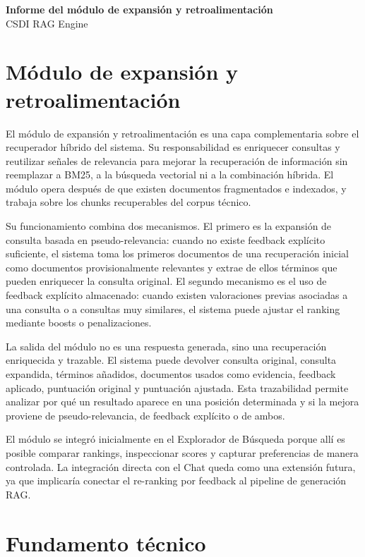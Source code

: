 \documentclass[12pt,a4paper]{article}
\begin{document}
\begin{center}
  {\Large\bfseries Informe del módulo de expansión y retroalimentación}\\[0.35cm]
  {\large CSDI RAG Engine}
\end{center}
\vspace{0.2cm}

\section{Módulo de expansión y retroalimentación}

El módulo de expansión y retroalimentación es una capa complementaria sobre el recuperador híbrido del sistema. Su responsabilidad es enriquecer consultas y reutilizar señales de relevancia para mejorar la recuperación de información sin reemplazar a BM25, a la búsqueda vectorial ni a la combinación híbrida. El módulo opera después de que existen documentos fragmentados e indexados, y trabaja sobre los chunks recuperables del corpus técnico.

Su funcionamiento combina dos mecanismos. El primero es la expansión de consulta basada en pseudo-relevancia: cuando no existe feedback explícito suficiente, el sistema toma los primeros documentos de una recuperación inicial como documentos provisionalmente relevantes y extrae de ellos términos que pueden enriquecer la consulta original. El segundo mecanismo es el uso de feedback explícito almacenado: cuando existen valoraciones previas asociadas a una consulta o a consultas muy similares, el sistema puede ajustar el ranking mediante boosts o penalizaciones.

La salida del módulo no es una respuesta generada, sino una recuperación enriquecida y trazable. El sistema puede devolver consulta original, consulta expandida, términos añadidos, documentos usados como evidencia, feedback aplicado, puntuación original y puntuación ajustada. Esta trazabilidad permite analizar por qué un resultado aparece en una posición determinada y si la mejora proviene de pseudo-relevancia, de feedback explícito o de ambos.

El módulo se integró inicialmente en el Explorador de Búsqueda porque allí es posible comparar rankings, inspeccionar scores y capturar preferencias de manera controlada. La integración directa con el Chat queda como una extensión futura, ya que implicaría conectar el re-ranking por feedback al pipeline de generación RAG.

\section{Fundamento técnico}
\end{document}
